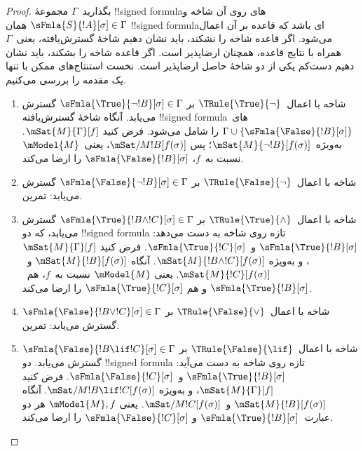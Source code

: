 \documentclass[../../../include/open-logic-section]{subfiles}
\begin{document}
\begin{proof}
بگذارید~$\Gamma$ مجموعهٔ !!{signed formula}های روی آن شاخه و
$\sFmla{S}{!A}[\sigma] \in \Gamma$ همان !!{signed formula}ای باشد که
قاعده بر آن اعمال می‌شود. اگر قاعده شاخه را نشکند، باید نشان دهیم شاخهٔ
گسترش‌یافته، یعنی~$\Gamma$ همراه با نتایج قاعده، همچنان ارضاپذیر است.
اگر قاعده شاخه را بشکند، باید نشان دهیم دست‌کم یکی از دو شاخهٔ حاصل
ارضاپذیر است.
نخست استنتاج‌های ممکن با تنها یک مقدمه را بررسی می‌کنیم.
\begin{enumerate}
\item شاخه با اعمال~$\TRule{\True}{\lnot}$ بر
  $\sFmla{\True}{\lnot !B}[\sigma] \in \Gamma$ گسترش می‌یابد. آنگاه
  شاخهٔ گسترش‌یافته !!{signed formula}های~$\Gamma \cup
  \{\sFmla{\False}{!B}[\sigma]\}$ را شامل می‌شود. فرض کنید
  $\mSat{M}{\Gamma}[f]$. به‌ویژه~$\mSat{M}{\lnot !B}[f(\sigma)]$؛ پس
  $\mSat/{M}{!B}[f(\sigma)]$، یعنی~$\mModel{M}$ نسبت به~$f$،
  $\sFmla{\False}{!B}[\sigma]$ را ارضا می‌کند.
\item شاخه با اعمال~$\TRule{\False}{\lnot}$ بر
  $\sFmla{\False}{\lnot !B}[\sigma] \in \Gamma$ گسترش می‌یابد: تمرین.
\item شاخه با اعمال~$\TRule{\True}{\land}$ بر
  $\sFmla{\True}{!B \land !C}[\sigma] \in \Gamma$ گسترش می‌یابد، که
  دو !!{signed formula} تازه روی شاخه به دست می‌دهد:
  $\sFmla{\True}{!B}[\sigma]$ و~$\sFmla{\True}{!C}[\sigma]$. فرض کنید
  $\mSat{M}{\Gamma}[f]$، و به‌ویژه
  $\mSat{M}{!B \land !C}[f(\sigma)]$. آنگاه
  $\mSat{M}{!B}[f(\sigma)]$ و~$\mSat{M}{!C}[f(\sigma)]$. یعنی
  $\mModel{M}$ نسبت به~$f$، هم~$\sFmla{\True}{!B}[\sigma]$ و هم
  $\sFmla{\True}{!C}[\sigma]$ را ارضا می‌کند.
\item شاخه با اعمال~$\TRule{\False}{\lor}$ بر
  $\sFmla{\False}{!B \lor !C}[\sigma] \in \Gamma$ گسترش می‌یابد: تمرین.
\item شاخه با اعمال~$\TRule{\False}{\lif}$ بر
  $\sFmla{\False}{!B \lif !C}[\sigma] \in \Gamma$ گسترش می‌یابد. دو
  !!{signed formula} تازه روی شاخه به دست می‌آید:
  $\sFmla{\True}{!B}[\sigma]$ و~$\sFmla{\False}{!C}[\sigma]$. فرض کنید
  $\mSat{M}{\Gamma}[f]$، و به‌ویژه
  $\mSat/{M}{!B \lif !C}[f(\sigma)]$. آنگاه
  $\mSat{M}{!B}[f(\sigma)]$ و~$\mSat/{M}{!C}[f(\sigma)]$. یعنی
  $\mModel{M}, f$ هر دو عبارت~$\sFmla{\True}{!B}[\sigma]$ و
  $\sFmla{\False}{!C}[\sigma]$ را ارضا می‌کند.

\end{enumerate}
\end{proof}
\end{document}
